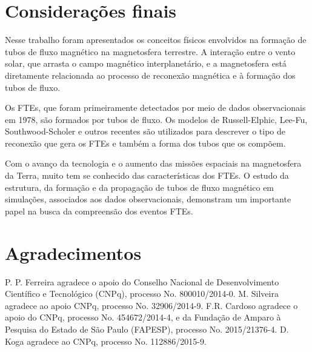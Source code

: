 \section{Considerações finais}

Nesse trabalho foram apresentados os conceitos físicos envolvidos na formação de tubos de fluxo magnético na magnetosfera terrestre. A interação entre o vento solar, que arrasta o campo magnético interplanetário, e a magnetosfera está diretamente relacionada ao processo de reconexão magnética e à formação dos tubos de fluxo. 

Os FTEs, que foram primeiramente detectados por meio de dados observacionais em 1978, são formados por tubos de fluxo. Os modelos de Russell-Elphic, Lee-Fu, Southwood-Scholer e outros recentes são utilizados para descrever o tipo de reconexão que gera os FTEs e também a forma dos tubos que os compõem. 

Com o avanço da tecnologia e o aumento das missões espaciais na magnetosfera da Terra, muito tem se conhecido das características dos FTEs. O estudo da estrutura, da formação e da propagação de tubos de fluxo magnético em simulações, associados aos dados observacionais, demonstram um importante papel na busca da compreensão dos eventos FTEs. 


\section*{Agradecimentos}

P. P. Ferreira agradece o apoio do Conselho Nacional de Desenvolvimento Científico e Tecnológico (CNPq), processo No. 800010/2014-0. M. Silveira agradece ao apoio CNPq, processo No. 32906/2014-9. F.R. Cardoso agradece o apoio do CNPq, processo No. 454672/2014-4, e da
Fundação de Amparo à Pesquisa do Estado de São Paulo (FAPESP), processo No. 2015/21376-4. D. Koga agradece ao CNPq, processo No. 112886/2015-9. 


%
%

